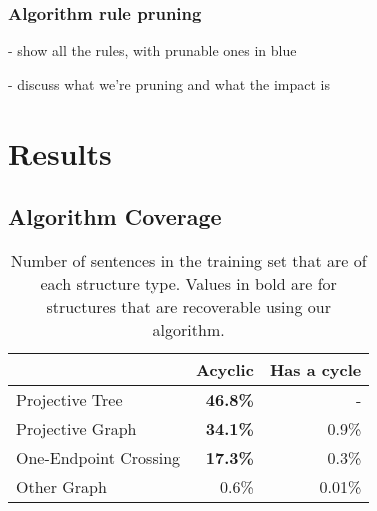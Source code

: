 \subsubsection{Algorithm rule pruning}

- show all the rules, with prunable ones in blue

- discuss what we're pruning and what the impact is


\section{Results}

\subsection{Algorithm Coverage}

\begin{table}
  \centering
  \begin{tabular}{|lrr|}
    \hline
      & Acyclic & Has a cycle \\
    \hline
    \hline
    Projective Tree & \textbf{46.8\%} & - \\
    Projective Graph & \textbf{34.1\%} & 0.9\% \\
    One-Endpoint Crossing & \textbf{17.3\%} & 0.3\% \\
    Other Graph & 0.6\% & 0.01\% \\
    \hline
  \end{tabular}
  \caption{\label{tab:structures}
    Number of sentences in the training set that are of each structure type.
    Values in bold are for structures that are recoverable using our algorithm.
  }
\end{table}


